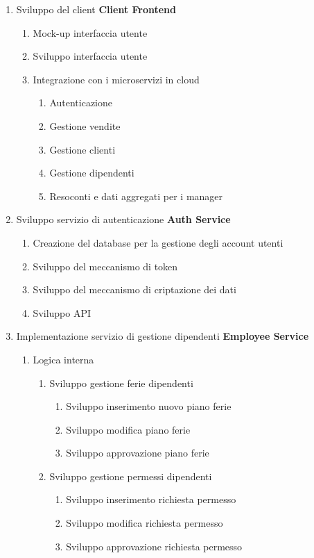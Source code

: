 \documentclass{article}
\begin{document}
  \begin{enumerate}
    \item Sviluppo del client \textbf{Client Frontend}
    \begin{enumerate}
        \item Mock-up interfaccia utente
        \item Sviluppo interfaccia utente
        \item Integrazione con i microservizi in cloud
        \begin{enumerate}
            \item Autenticazione
            \item Gestione vendite
            \item Gestione clienti
            \item Gestione dipendenti
            \item Resoconti e dati aggregati per i manager
        \end{enumerate}
    \end{enumerate}
    \item Sviluppo servizio di autenticazione \textbf{Auth Service}
    \begin{enumerate}
        \item Creazione del database per la gestione degli account utenti
        \item Sviluppo del meccanismo di token
        \item Sviluppo del meccanismo di criptazione dei dati
        \item Sviluppo API
    \end{enumerate}
    \item Implementazione servizio di gestione dipendenti \textbf{Employee Service}
    \begin{enumerate}
        \item Logica interna
        \begin{enumerate}
            \item Sviluppo gestione ferie dipendenti
            \begin{enumerate}
                \item Sviluppo inserimento nuovo piano ferie
                \item Sviluppo modifica piano ferie
                \item Sviluppo approvazione piano ferie
            \end{enumerate}
            \item Sviluppo gestione permessi dipendenti
            \begin{enumerate}
                \item Sviluppo inserimento richiesta permesso
                \item Sviluppo modifica richiesta permesso
                \item Sviluppo approvazione richiesta permesso
            \end{enumerate}
        \end{enumerate}


\end{enumerate}
\end{enumerate}
\end{document}
